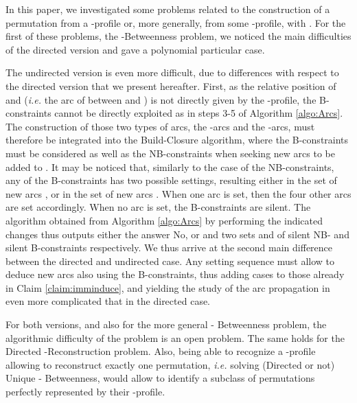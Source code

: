 \documentclass{article}
\begin{document}
In this paper, we investigated some problems related to the construction of
a permutation from a -profile or, more generally, from some -profile,
with . For the first of these problems, the -{\sc Betweenness} problem,
we noticed the main difficulties of the directed version and gave a polynomial particular case.

The undirected version is even more difficult, due to differences with respect to the
directed version that we  present hereafter. First, as the relative position of  and 
({\em i.e.} the arc of  between  and ) is not directly given by the 
-profile, the B-constraints cannot be directly exploited as in steps 3-5 of 
Algorithm \ref{algo:Arcs}. The construction of those two types of arcs, the -arcs and
the -arcs, must therefore be integrated into the Build-Closure algorithm, 
where the B-constraints must be considered as well as the NB-constraints when seeking  
new arcs to be added to . It may be noticed that, similarly to the case of the NB-constraints,  
any of the B-constraints  has two possible settings, resulting either in the  
set of new  arcs 
, or in the set of new arcs
. When one arc is set, then
the four other arcs are set accordingly. When no arc is set, the B-constraints are silent.
The algorithm obtained from Algorithm \ref{algo:Arcs} by performing the indicated changes
thus outputs either the answer No, or  and two  sets  and  of
silent NB- and silent B-constraints respectively.
We thus arrive at the second main difference between the directed and undirected case. 
Any setting sequence must allow to deduce new arcs also using the B-constraints, 
thus adding  cases to those already in Claim \ref{claim:imminduce}, and yielding the
study of the arc propagation in  even more complicated that in the directed case.

For both versions, and also for the more general - {\sc Betweenness} problem, the 
algorithmic difficulty of the problem is an open problem. The same holds for the
{\sc Directed -Reconstruction} problem. Also, being able to recognize
a -profile allowing to reconstruct exactly one permutation, {\em i.e.} solving
(Directed or not) {\sc Unique} - {\sc Betweenness}, would allow to
identify a subclass of permutations perfectly represented by their -profile.




\end{document}
